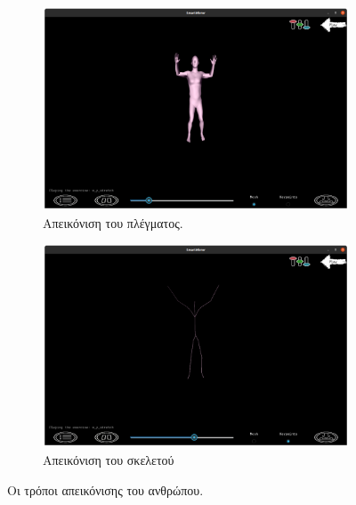 \begin{figure}[h]
	\centering
	\begin{subfigure}[h]{0.45\textwidth}
		\centering
		\includegraphics[width=\textwidth]{images/chapter5/render_mesh.png}
		\caption{Απεικόνιση του πλέγματος.}
	\end{subfigure}
	\hfill
	\begin{subfigure}[h]{0.45\textwidth}
		\centering
		\includegraphics[width=\textwidth]{images/chapter5/render_kpnt.png}
		\caption{Απεικόνιση του σκελετού}
	\end{subfigure}
	\caption{Οι τρόποι απεικόνισης του ανθρώπου.}
	\label{fig:render_options}
\end{figure}

